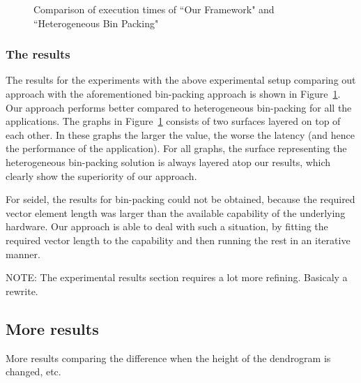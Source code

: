 \begin{figure}[t!]
{    \label{fig:jacl1ho}
  }
  \caption{Comparison of execution times of ``Our Framework" and
    ``Heterogeneous Bin Packing"}
  \label{fig:ho}
\end{figure}

\subsubsection{The results}
\label{sec:results-1}

The results for the experiments with the above experimental setup
comparing out approach with the aforementioned bin-packing approach is
shown in Figure~\ref{fig:ho}. Our approach performs better compared to
heterogeneous bin-packing for all the applications. The graphs in
Figure~\ref{fig:ho} consists of two surfaces layered on top of each
other. In these graphs the larger the value, the worse the latency (and
hence the performance of the application). For all graphs, the surface
representing the heterogeneous bin-packing solution is always layered
atop our results, which clearly show the superiority of our approach.

For seidel, the results for bin-packing could not be obtained, because the  
required
vector element length was larger than the available capability of the
underlying hardware. Our approach is able to deal with such a situation,
by fitting the required vector length to the capability and then running
the rest in an iterative manner.

NOTE: The experimental results section requires a lot more
refining. Basicaly a rewrite.

\subsection{More results}
\label{sec:more-results}

More results comparing the difference when the height of the dendrogram
is changed, etc.


